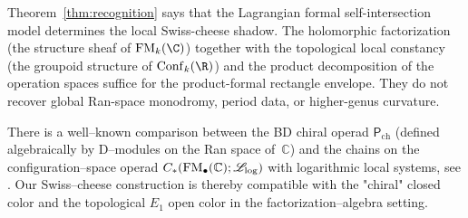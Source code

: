 \begin{remark}
\label{rem:recognition-correspondence}
Theorem~\ref{thm:recognition} says that the Lagrangian formal
self-intersection model determines the local Swiss-cheese shadow.
The holomorphic factorization (the structure sheaf of $\FM_k(\C)$)
together with the topological local constancy (the groupoid structure
of $\Conf_k(\R)$) and the product decomposition of the operation
spaces suffice for the product-formal rectangle envelope. They do not
recover global Ran-space monodromy, period data, or higher-genus
curvature.
\end{remark}

\begin{remark}
\label{rmk:BD-comparison}
There is a well--known comparison between the BD chiral operad
$\mathsf P_{\mathrm{ch}}$ (defined algebraically by D--modules on the Ran space of~$\mathbb C$)
and the chains on the configuration--space operad
$C_\ast(\mathrm{FM}_\bullet(\mathbb C);\mathscr L_{\log})$ with logarithmic local systems, see
\cite{HA,CG17}.
Our Swiss--cheese construction is thereby compatible with the "chiral" closed color and the
topological $E_1$ open color in the factorization--algebra setting.
\end{remark}

